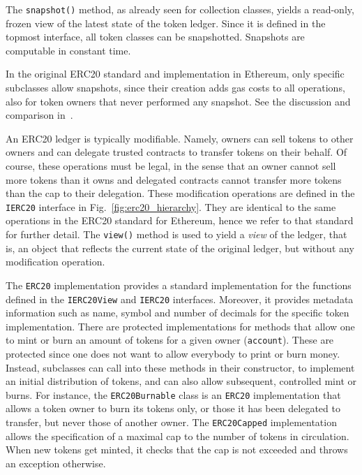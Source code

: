 The \texttt{snapshot()} method,
as already seen for collection classes, yields a read-only,
frozen view of the latest state of the token ledger.
Since it is defined in the topmost interface, all token classes
can be snapshotted. Snapshots are computable in constant time.
%
\begin{commentbox}
In the original ERC20 standard and implementation in Ethereum,
only specific subclasses allow snapshots, since their creation adds gas costs to all
operations, also for token owners that never performed any snapshot.
See the discussion and comparison in~\cite{CrosaraOST23}.
\end{commentbox}

An ERC20 ledger is typically modifiable. Namely, owners
can sell tokens to other owners
and can delegate trusted contracts to transfer tokens on their behalf.
Of course, these operations must be legal, in the sense that an owner cannot sell
more tokens than it owns and delegated contracts cannot transfer more tokens than the
cap to their delegation.
These modification operations are defined in the
\texttt{IERC20} interface in Fig.~\ref{fig:erc20_hierarchy}. They are identical to the same
operations in the ERC20 standard for Ethereum, hence we refer to that standard for further detail.
The \texttt{view()} method is used to yield a \emph{view} of the ledger, that is, an object
that reflects the current state of the original ledger, but without any modification operation.

The \texttt{ERC20} implementation provides a standard implementation for the functions defined
in the \texttt{IERC20View} and \texttt{IERC20} interfaces. Moreover, it provides metadata information
such as name, symbol and number of decimals for the specific token implementation.
There are protected implementations for methods that allow one to mint or burn an amount
of tokens for a given owner (\texttt{account}). These are protected since one does not
want to allow everybody to print or burn money. Instead, subclasses can call into these
methods in their constructor, to implement an initial distribution of tokens,
and can also allow subsequent, controlled mint or burns.
For instance, the \texttt{ERC20Burnable}
class is an \texttt{ERC20} implementation that
allows a token owner to burn its tokens only, or those it has been
delegated to transfer, but never those of another owner.
The \texttt{ERC20Capped} implementation
allows the specification of a maximal cap to the
number of tokens in circulation. When new tokens get minted, it checks that the cap
is not exceeded and throws an exception otherwise.

